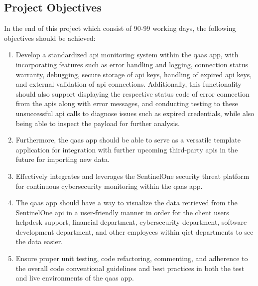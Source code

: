 \begin{multicols}{2}
      \section{Project Objectives}
      In the end of this project which consist of 90-99 working days, the following objectives should be achieved:
      \begin{enumerate}
            \item Develop a standardized \acrshort{api} monitoring system within the \acrshort{qaas} app, with
                  incorporating features such as error handling and logging, connection status warranty, debugging, 
                  secure storage of \acrshort{api} keys, handling of expired \acrshort{api} keys, and external 
                  validation of \acrshort{api} connections. Additionally, this functionality should also support
                  displaying the respective status code of error connection from the \acrshort{api}s along with
                  error messages, and conducting testing to these unsuccessful \acrshort{api} calls to diagnose
                  issues such as expired credentials, while also being able to inspect the payload for further
                  analysis.
            \item Furthermore, the \acrshort{qaas} app should be able to serve as a versatile template application 
                  for integration with further upcoming third-party \acrshort{api}s in the future for importing 
                  new data.
            \item Effectively integrates and leverages the SentinelOne security threat platform for continuous
                  cybersecurity monitoring within the \acrshort{qaas} app.
            \item The \acrshort{qaas} app should have a way to visualize the data retrieved from the SentinelOne 
                  \acrshort{api} in a user-friendly manner in order for the client users helpdesk support, financial 
                  department, cybersecurity department, software development department, and other employees within
                  \acrshort{qict}  departments to see the data easier.
            \item Ensure proper unit testing, code refactoring, commenting, and adherence to the overall code
                  conventional guidelines and best practices in both the test and live environments of the
                  \acrshort{qaas} app.
      \end{enumerate}

\end{multicols}
